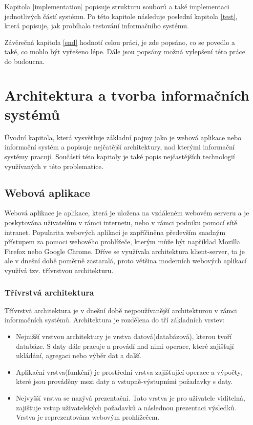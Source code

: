 Kapitola \ref{implementation} popisuje strukturu souborů a také implementaci jednotlivých částí systému. Po této kapitole následuje poslední kapitola \ref{test}, která popisuje, jak probíhalo testování informačního systému.

Závěrečná kapitola \ref{end} hodnotí celou práci, je zde popsáno, co se povedlo a také, co mohlo být vyřešeno lépe. Dále jsou popsány možná vylepšení této práce do budoucna.

\chapter{Architektura a tvorba informačních systémů}
\label{architecture}
Úvodní kapitola, která vysvětluje základní pojmy jako je webová aplikace nebo informační systém a popisuje nejčatější architektury, nad kterými informační systémy pracují. Součástí této kapitoly je také popis nejčastějších technologií využívaných v této  problematice.


\section{Webová aplikace}


Webová aplikace je aplikace, která je uložena na vzdáleném webovém serveru a je poskytována uživatelům v rámci internetu, nebo v rámci podniku pomocí sítě intranet. Popularita webových aplikací je zapříčiněna především snadným přístupem za pomoci webového prohlížeče, kterým může být například Mozilla Firefox nebo Google Chrome. \cite{webapp}
Dříve se využívala architektura klient-server, ta je ale v dnešní době poměrně zastaralá, proto většina moderních webových aplikací využívá tzv. třívrstvou architekturu.

\subsection{Třívrstvá architektura}

Třívrstvá architektura je v dnešní době nejpoužívanější architekturou v rámci informačních systémů. Architektura je rozdělena do tří základních vrstev: \cite{threelayer}


\begin{itemize}
  \item{Nejnižší vrstvou architektury je vrstva datová(databázová), kterou tvoří databáze. S daty dále pracuje a provádí nad nimi operace, které zajišťují ukládání, agregaci nebo výběr dat a další.}
  \item{Aplikační vrstva(funkční) je prostřední vrstva zajišťující operace a výpočty, které jsou prováděny mezi daty a vstupně-výstupními požadavky s daty.}
  \item{Nejvyšší vrstva se nazývá prezentační. Tato vrstva je pro uživatele viditelná, zajišťuje vstup uživatelských požadavků a  následnou prezentaci výsledků. Vrstva je reprezentována webovým prohlížečem. }
\end{itemize}

